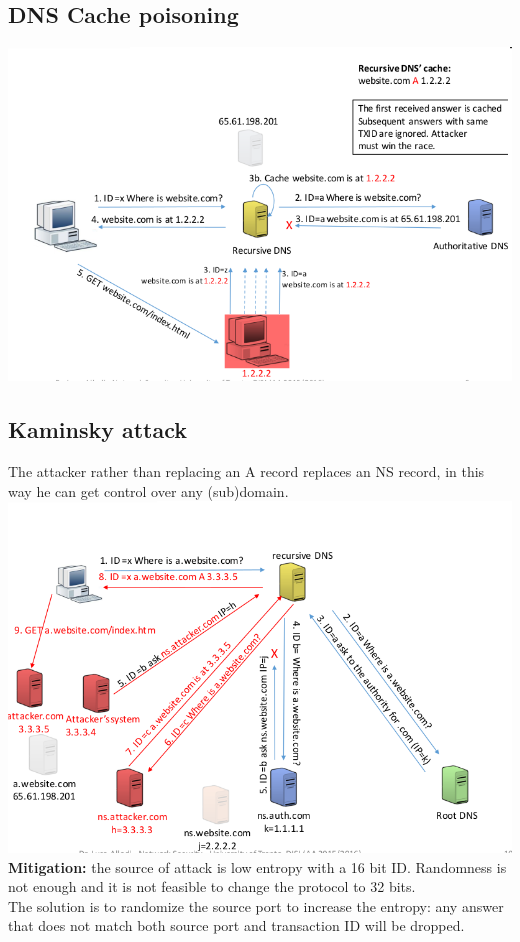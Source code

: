 \documentclass[10pt,a4paper]{book}
\begin{document}
\subsection{DNS Cache poisoning}
\includegraphics[scale=0.6]{dns-poisoning.png}
\newpage
\subsection{Kaminsky attack}
The attacker rather than replacing an A record replaces an NS record, in this way he can get control over any (sub)domain.\\
\includegraphics[scale=0.6]{kaminsky-attack.png}\\
\textbf{Mitigation:} the source of attack is low entropy with a 16 bit ID. Randomness is not enough and it is not feasible to change the protocol to 32 bits. \\
The solution is to randomize the source port to increase the entropy: any answer that does not match both source port and transaction ID will be dropped.
\newpage
\end{document}
